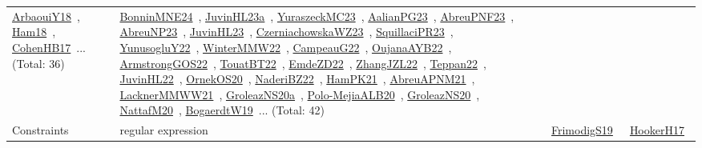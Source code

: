 {\begin{longtable}{lp{3cm}>{\raggedright\arraybackslash}p{6cm}>{\raggedright\arraybackslash}p{6cm}>{\raggedright\arraybackslash}p{8cm}}
\href{../works/ArbaouiY18.pdf}{ArbaouiY18}~\cite{ArbaouiY18}, \href{../works/Ham18.pdf}{Ham18}~\cite{Ham18}, \href{../works/CohenHB17.pdf}{CohenHB17}~\cite{CohenHB17}... (Total: 36) & \href{../works/BonninMNE24.pdf}{BonninMNE24}~\cite{BonninMNE24}, \href{../works/JuvinHL23a.pdf}{JuvinHL23a}~\cite{JuvinHL23a}, \href{../works/YuraszeckMC23.pdf}{YuraszeckMC23}~\cite{YuraszeckMC23}, \href{../works/AalianPG23.pdf}{AalianPG23}~\cite{AalianPG23}, \href{../works/AbreuPNF23.pdf}{AbreuPNF23}~\cite{AbreuPNF23}, \href{../works/AbreuNP23.pdf}{AbreuNP23}~\cite{AbreuNP23}, \href{../works/JuvinHL23.pdf}{JuvinHL23}~\cite{JuvinHL23}, \href{../works/CzerniachowskaWZ23.pdf}{CzerniachowskaWZ23}~\cite{CzerniachowskaWZ23}, \href{../works/SquillaciPR23.pdf}{SquillaciPR23}~\cite{SquillaciPR23}, \href{../works/YunusogluY22.pdf}{YunusogluY22}~\cite{YunusogluY22}, \href{../works/WinterMMW22.pdf}{WinterMMW22}~\cite{WinterMMW22}, \href{../works/CampeauG22.pdf}{CampeauG22}~\cite{CampeauG22}, \href{../works/OujanaAYB22.pdf}{OujanaAYB22}~\cite{OujanaAYB22}, \href{../works/ArmstrongGOS22.pdf}{ArmstrongGOS22}~\cite{ArmstrongGOS22}, \href{../works/TouatBT22.pdf}{TouatBT22}~\cite{TouatBT22}, \href{../works/EmdeZD22.pdf}{EmdeZD22}~\cite{EmdeZD22}, \href{../works/ZhangJZL22.pdf}{ZhangJZL22}~\cite{ZhangJZL22}, \href{../works/Teppan22.pdf}{Teppan22}~\cite{Teppan22}, \href{../works/JuvinHL22.pdf}{JuvinHL22}~\cite{JuvinHL22}, \href{../works/OrnekOS20.pdf}{OrnekOS20}~\cite{OrnekOS20}, \href{../works/NaderiBZ22.pdf}{NaderiBZ22}~\cite{NaderiBZ22}, \href{../works/HamPK21.pdf}{HamPK21}~\cite{HamPK21}, \href{../works/AbreuAPNM21.pdf}{AbreuAPNM21}~\cite{AbreuAPNM21}, \href{../works/LacknerMMWW21.pdf}{LacknerMMWW21}~\cite{LacknerMMWW21}, \href{../works/GroleazNS20a.pdf}{GroleazNS20a}~\cite{GroleazNS20a}, \href{../works/Polo-MejiaALB20.pdf}{Polo-MejiaALB20}~\cite{Polo-MejiaALB20}, \href{../works/GroleazNS20.pdf}{GroleazNS20}~\cite{GroleazNS20}, \href{../works/NattafM20.pdf}{NattafM20}~\cite{NattafM20}, \href{../works/BogaerdtW19.pdf}{BogaerdtW19}~\cite{BogaerdtW19}... (Total: 42)\\
Constraints & regular expression &  & \href{../works/FrimodigS19.pdf}{FrimodigS19}~\cite{FrimodigS19} & \href{../works/HookerH17.pdf}{HookerH17}~\cite{HookerH17}\\

\end{longtable}}
